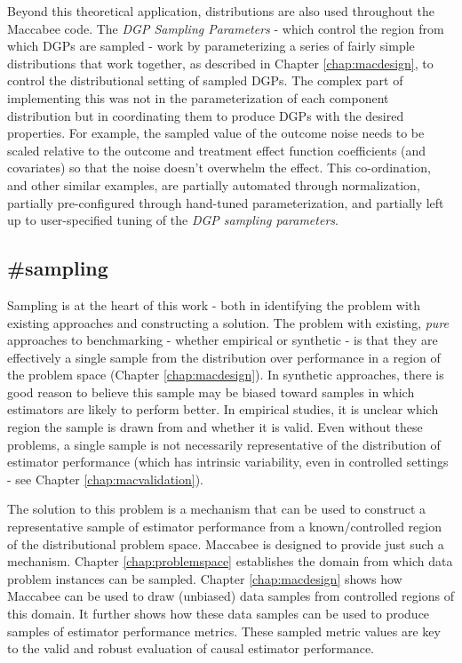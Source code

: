 \documentclass[./main.tex]{subfiles}
\begin{document}
Beyond this theoretical application, distributions are also used throughout the Maccabee code. The \textit{DGP Sampling Parameters} - which control the region from which DGPs are sampled - work by parameterizing a series of fairly simple distributions that work together, as described in Chapter \ref{chap:macdesign}, to control the distributional setting of sampled DGPs. The complex part of implementing this was not in the parameterization of each component distribution but in coordinating them to produce DGPs with the desired properties. For example, the sampled value of the outcome noise needs to be scaled relative to the outcome and treatment effect function coefficients (and covariates) so that the noise doesn't overwhelm the effect. This co-ordination, and other similar examples, are partially automated through normalization, partially pre-configured through hand-tuned parameterization, and partially left up to user-specified tuning of the \textit{DGP sampling parameters}.


\subsection*{\textbf{\#sampling}}
\label{hc:sampling}

Sampling is at the heart of this work - both in identifying the problem with existing approaches and constructing a solution. The problem with existing, \textit{pure} approaches to benchmarking - whether empirical or synthetic - is that they are effectively a single sample from the distribution over performance in a region of the problem space (Chapter \ref{chap:macdesign}). In synthetic approaches, there is good reason to believe this sample may be biased toward samples in which estimators are likely to perform better. In empirical studies, it is unclear which region the sample is drawn from and whether it is valid. Even without these problems, a single sample is not necessarily representative of the distribution of estimator performance (which has intrinsic variability, even in controlled settings - see Chapter \ref{chap:macvalidation}).

\vspace{\baselineskip}

The solution to this problem is a mechanism that can be used to construct a representative sample of estimator performance from a known/controlled region of the distributional problem space. Maccabee is designed to provide just such a mechanism. Chapter \ref{chap:problemspace} establishes the domain from which data problem instances can be sampled. Chapter \ref{chap:macdesign} shows how Maccabee can be used to draw (unbiased) data samples from controlled regions of this domain. It further shows how these data samples can be used to produce samples of estimator performance metrics. These sampled metric values are key to the valid and robust evaluation of causal estimator performance.
\end{document}
